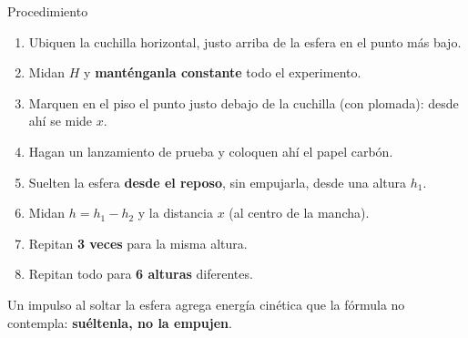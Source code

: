 \documentclass[aspectratio=169,xcolor=dvipsnames]{beamer}
\begin{document}
	\begin{frame}{Procedimiento}
		\begin{enumerate}
			\setlength{\itemsep}{6pt}
			\small
			\item Ubiquen la cuchilla horizontal, justo arriba de la esfera en el
			punto más bajo.
			\item Midan $H$ y \textbf{manténganla constante} todo el experimento.
			\item Marquen en el piso el punto justo debajo de la cuchilla (con
			plomada): desde ahí se mide $x$.
			\item Hagan un lanzamiento de prueba y coloquen ahí el papel carbón.
			\item Suelten la esfera \textbf{desde el reposo}, sin empujarla, desde
			una altura $h_1$.
			\item Midan $h = h_1 - h_2$ y la distancia $x$ (al centro de la
			mancha).
			\item Repitan \textbf{3 veces} para la misma altura.
			\item Repitan todo para \textbf{6 alturas} diferentes.
		\end{enumerate}
		
		\vspace{0.2cm}
		\begin{alertblock}{}
			\centering
			Un impulso al soltar la esfera agrega energía cinética que la
			fórmula no contempla: \textbf{suéltenla, no la empujen}.
		\end{alertblock}
	\end{frame}
	
\end{document}
